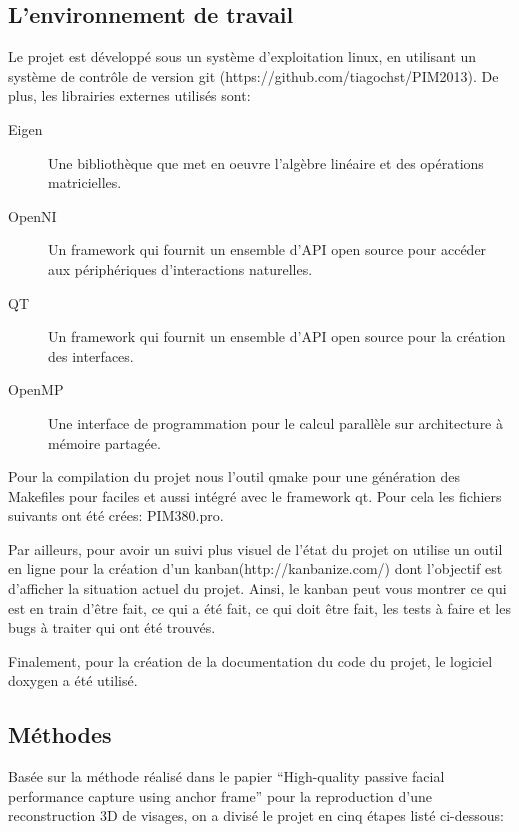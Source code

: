 \documentclass[a4paper,12pt]{article}
\begin{document}
\subsection{L'environnement de travail}

Le projet est développé sous un système d'exploitation linux, en
utilisant un système de contrôle de version git
(https://github.com/tiagochst/PIM2013).  
De plus, les librairies externes utilisés sont:

\begin{description}

\item[Eigen] Une bibliothèque que met en oeuvre l'algèbre linéaire et des opérations matricielles.\cite{Eigen}

\item[OpenNI] Un framework qui fournit un ensemble d'API open source
  pour accéder aux périphériques d'interactions naturelles.\cite{PrimeSense2010}

\item[QT] Un framework qui fournit un ensemble d'API open source
  pour la création des interfaces.\cite{QT}

\item[OpenMP] Une interface de programmation pour le calcul parallèle
  sur architecture à mémoire partagée.\cite{OpenMP} 

\end{description}

Pour la compilation du projet nous l’outil qmake
pour une génération des Makefiles pour faciles et aussi intégré avec
le framework qt.  
Pour cela les fichiers suivants ont été crées: PIM380.pro. 

Par ailleurs, pour avoir un suivi plus visuel de l’état du projet on
utilise un outil en ligne pour la création d’un
kanban(http://kanbanize.com/) dont l’objectif est d’afficher la
situation actuel du projet. Ainsi, le kanban peut vous montrer ce qui
est en train d’être fait, ce qui a été fait, ce qui doit être fait,
les tests à faire et les bugs à traiter qui ont été trouvés. 

Finalement, pour la création de la documentation du code du projet, le
logiciel doxygen a été utilisé.  


\subsection{Méthodes}

Basée sur la méthode réalisé dans le papier ``High-quality passive
facial performance capture using anchor
frame''\cite{Beeler:2011:HPF:2010324.1964970} pour la reproduction
d'une reconstruction 3D de visages, on a divisé le projet en cinq
étapes listé ci-dessous: 
\end{document}
